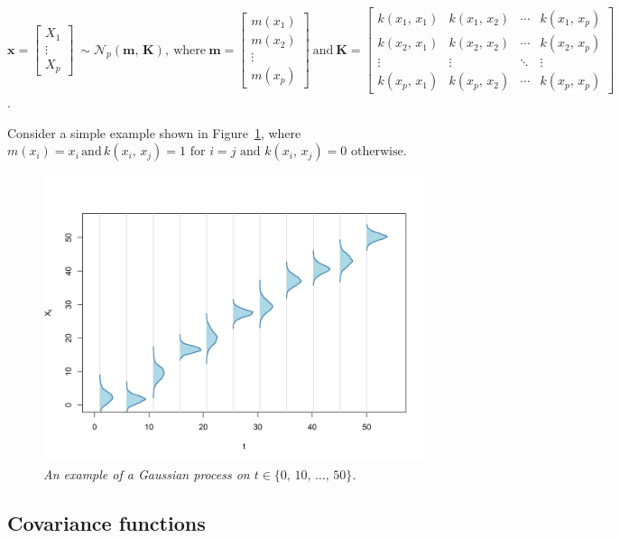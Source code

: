 \documentclass[a4paper, 10pt, fleqn]{article}
\begin{document}
\begin{flushleft}
   $\mathbf{x} =
   \begin{bmatrix}
      X_{1} \\
      \vdots \\
      X_{p}
   \end{bmatrix}
   \:
   \sim \mathcal{N}_{p}(\mathbf{m}, \, \mathbf{K}),
   \:
   \text{where}
   \:
   \mathbf{m} = 
   \begin{bmatrix}
      m(x_{1}) \\
      m(x_{2}) \\
      \vdots \\
      m(x_{p})
   \end{bmatrix}  
   \: 
   \text{and}
   \:
   \mathbf{K} = 
   \begin{bmatrix}
      k(x_{1}, \, x_{1}) & k(x_{1}, \, x_{2}) & \cdots & k(x_{1}, \, x_{p}) \\
      k(x_{2}, \, x_{1}) & k(x_{2}, \, x_{2}) & \cdots & k(x_{2}, \, x_{p}) \\
      \vdots & \vdots & \ddots & \vdots \\
      k(x_{p}, \, x_{1}) & k(x_{p}, \, x_{2}) & \cdots & k(x_{p}, \, x_{p})
   \end{bmatrix}$.
   
   \vspace{1em}

   Consider a simple example shown in Figure~\ref{figure_1}, where $m(x_{i}) = x_{i} \, \text{and} \, k(x_{i},\, x_{j}) = 1 \text{ for } i=j \text{ and } k(x_{i},\, x_{j}) = 0 \text{ otherwise}$. 

   \begin{figure}[H]
      \centering
      \includegraphics[width=0.48\linewidth]{../img/gp.png}
      \caption{\textit{An example of a Gaussian process on $t \in \{0, \, 10, \, \ldots, \, 50\}$.}}
      \label{figure_1}
   \end{figure}

   \subsection*{Covariance functions}


\end{flushleft}
\end{document}
